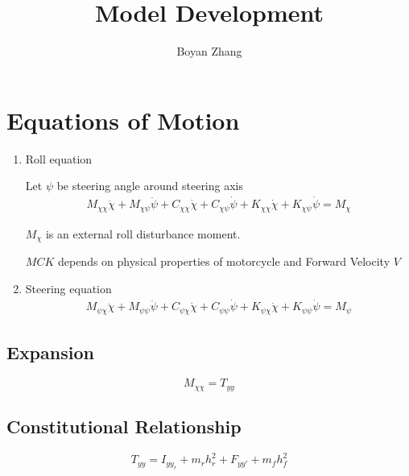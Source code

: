 \documentclass[11pt]{article}
\begin{document}
\author{Boyan Zhang}
\title{Model Development}
\maketitle

\section{Equations of Motion}

\begin{enumerate}

\item %
Roll equation

Let $\psi$ be steering angle around steering axis
\begin{align}
    M_{\chi\chi} \ddot{\chi} + M_{\chi\psi} \ddot{\psi} + C_{\chi\chi} \dot{\chi} + C_{\chi\psi} \dot{\psi} + K_{\chi\chi} \dot{\chi} + K_{\chi\psi} \dot{\psi} = M_{\chi}
\end{align}

$M_{\chi}$ is an external roll disturbance moment.

$M C K$ depends on physical properties of motorcycle and Forward Velocity $V$

\item
Steering equation
\begin{align}
    M_{\psi\chi} \ddot{\chi} + M_{\psi\psi} \ddot{\psi} + C_{\psi\chi} \dot{\chi} + C_{\psi\psi} \dot{\psi} + K_{\psi\chi} \dot{\chi} + K_{\psi\psi} \dot{\psi} = M_{\psi}
\end{align}

\end{enumerate}

\subsection{Expansion}
    \begin{equation}
        M_{\chi\chi} = T_{yy}
    \end{equation}

\subsection{Constitutional Relationship}
\begin{equation}
    T_{yy} = I_{yy_{r}} + m_r h^2_{r} + F_{yy'} + m_fh_f^2
\end{equation}
\end{document}
